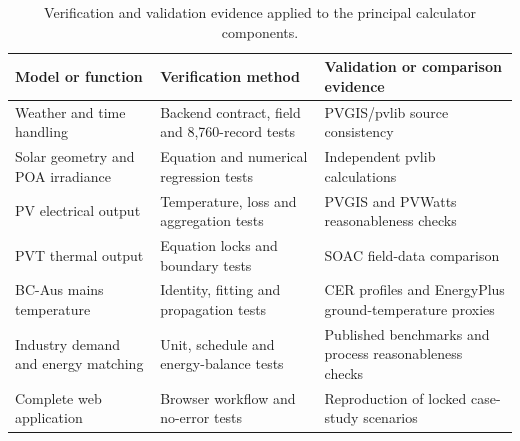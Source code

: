 \documentclass[12pt,letterpaper]{article}
\begin{document}
\begin{table}[!htb]
\centering
\renewcommand{\thetable}{6}
\footnotesize
\begin{tabular}{@{}>{\raggedright\arraybackslash}p{1.55in}>{\raggedright\arraybackslash}p{2.0in}>{\raggedright\arraybackslash}p{2.2in}@{}}
\toprule
\textbf{Model or function} & \textbf{Verification method} & \textbf{Validation or comparison evidence} \\
\midrule
Weather and time handling & Backend contract, field and 8,760-record tests & PVGIS/pvlib source consistency \\
Solar geometry and POA irradiance & Equation and numerical regression tests & Independent pvlib calculations \\
PV electrical output & Temperature, loss and aggregation tests & PVGIS and PVWatts reasonableness checks \\
PVT thermal output & Equation locks and boundary tests & SOAC field-data comparison \\
BC-Aus mains temperature & Identity, fitting and propagation tests & CER profiles and EnergyPlus ground-temperature proxies \\
Industry demand and energy matching & Unit, schedule and energy-balance tests & Published benchmarks and process reasonableness checks \\
Complete web application & Browser workflow and no-error tests & Reproduction of locked case-study scenarios \\
\bottomrule
\end{tabular}
\caption{Verification and validation evidence applied to the principal calculator components.}
\label{tab:validation-evidence}
\end{table}
\end{document}
